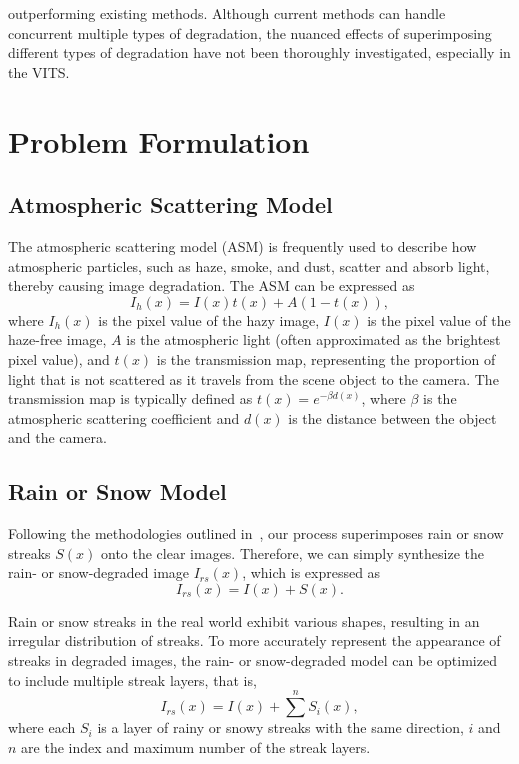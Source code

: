 \documentclass[final,12pt]{elsarticle}
\begin{document}
outperforming existing methods. Although current methods can handle concurrent multiple types of degradation, the nuanced effects of superimposing different types of degradation have not been thoroughly investigated, especially in the VITS.
%
\section{Problem Formulation}\label{sec:pf}
%
\subsection{Atmospheric Scattering Model}
%
    The atmospheric scattering model (ASM) is frequently used to describe how atmospheric particles, such as haze, smoke, and dust, scatter and absorb light, thereby causing image degradation. The ASM can be expressed as
    \begin{equation}   
        I_h(x) = I(x) t(x) + A (1 - t(x)),
    \end{equation}    
    where $I_h(x)$ is the pixel value of the hazy image, $I(x)$ is the pixel value of the haze-free image, $A$ is the atmospheric light (often approximated as the brightest pixel value), and $t(x)$ is the transmission map, representing the proportion of light that is not scattered as it travels from the scene object to the camera. The transmission map is typically defined as $t(x) = e^{-\beta d(x)}$, where $\beta$ is the atmospheric scattering coefficient and $d(x)$ is the distance between the object and the camera.
\subsection{Rain or Snow Model}
%
    Following the methodologies outlined in~\citep{li2019heavy, chen2021all}, our process superimposes rain or snow streaks $S(x)$ onto the clear images. Therefore, we can simply synthesize the rain- or snow-degraded image $I_{rs}(x)$, which is expressed as
    \begin{equation}\label{eq:haze}
        I_{rs}(x) = I(x) + S(x).
    \end{equation}

    Rain or snow streaks in the real world exhibit various shapes, resulting in an irregular distribution of streaks. To more accurately represent the appearance of streaks in degraded images, the rain- or snow-degraded model can be optimized to include multiple streak layers, that is,
    \begin{equation}\label{eq:rainsnow}
        I_{rs}(x)= I(x) +\sum^{n} S_{i}(x),
    \end{equation}
     where each $S_{i}$ is a layer of rainy or snowy streaks with the same direction, $i$ and $n$ are the index and maximum number of the streak layers.
\end{document}
